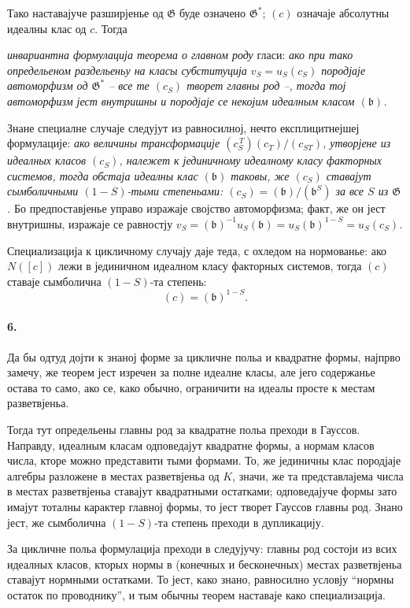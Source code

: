 ﻿\documentclass[11pt]{article}
\begin{document}
Тако наставајуче разширјенье од \(\mathfrak G\) буде означено \(\mathfrak G^\ast\); \((c)\) означаје абсолутны идеалны клас од \(c\). Тогда

\emph{инвариантна формулација теорема о главном роду} гласи: \emph{ако при тако определьеном раздельеньу на класы субституција \(v_S=u_S(c_S)\) породјаје автоморфизм од \(\mathfrak G^\ast\) -- все те \((c_S)\) творет главны род --, тогда тој автоморфизм јест внутришны и породјаје се некојим идеалным класом \((\mathfrak b)\).}

Знане специалне случаје следујут из равносилној, нечто експлицитнејшеј формулације: \emph{ако величины трансформације \((c_S^{\,T})(c_T)/(c_{ST})\), утворјене из идеалных класов \((c_S)\), належет к јединичному идеалному класу факторных системов, тогда обстаја идеалны клас \((\mathfrak b)\) таковы, же \((c_S)\) ставајут сымболичными \((1-S)\)-тыми степеньами: \((c_S)=(\mathfrak b)/(\mathfrak b^{S})\) за все \(S\) из \(\mathfrak G\).} Бо предпоставјенье управо изражаје својство автоморфизма; факт, же он јест внутришны, изражаје се равностју \(v_S=(\mathfrak b)^{-1}u_S(\mathfrak b)=u_S(\mathfrak b)^{1-S}=u_S(c_S)\).

Специализација к цикличному случају даје теда, с охледом на нормованье: ако \(N([c])\) лежи в јединичном идеалном класу факторных системов, тогда \((c)\) ставаје сымболична \((1-S)\)-та степень:
\[
(c)=(\mathfrak b)^{1-S}.
\]

\paragraph{6.}
Да бы одтуд дојти к знаној форме за цикличне польа и квадратне формы, најпрво замечу, же теорем јест изречен за полне идеалне класы, але јего содержанье остава то само, ако се, како обычно, ограничити на идеалы просте к местам разветвјеньа.

Тогда тут определьены главны род за квадратне польа преходи в Гауссов. Направду, идеалным класам одповедајут квадратне формы, а нормам класов числа, кторе можно представити тыми формами. То, же јединичны клас породјаје алгебры разложене в местах разветвјеньа од \(K\), значи, же та представлајема числа в местах разветвјеньа ставајут квадратными остатками; одповедајуче формы зато имајут тоталны карактер главној формы, то јест творет Гауссов главны род. Знано јест, же сымболична \((1-S)\)-та степень преходи в дупликацију.

За цикличне польа формулација преходи в следујучу: главны род состоји из всих идеалных класов, кторых нормы в (конечных и бесконечных) местах разветвјеньа ставајут нормными остатками. То јест, како знано, равносилно условју ``нормны остаток по проводнику'', и тым обычны теорем наставаје како специализација.
\end{document}
